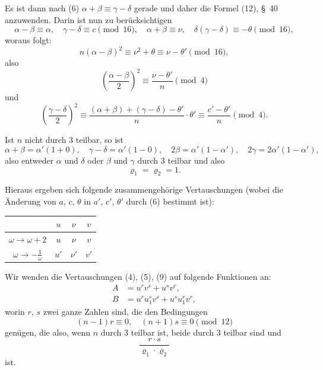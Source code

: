 \documentclass[12pt,a4paper]{article}
\theoremstyle{definition}
\begin{document}
Es ist dann nach (6) $\alpha + \beta \equiv \gamma - \delta$ gerade und daher die Formel (12), \S\ 40 anzuwenden. Darin ist nun zu berücksichtigen
\[
\alpha - \beta \equiv \alpha, \quad \gamma - \delta \equiv c \pmod{16}, \quad \alpha + \beta \equiv \nu, \quad \delta(\gamma - \delta) \equiv -\theta \pmod{16},
\]
woraus folgt:
\[
n(\alpha - \beta)^2 \equiv \nu^2 + \theta \equiv \nu - \theta' \pmod{16},
\]
also
\[
\left(\frac{\alpha - \beta}{2}\right)^2 \equiv \frac{\nu - \theta'}{n} \pmod{4}
\]
und
\[
\left(\frac{\gamma - \delta}{2}\right)^2 \equiv \frac{(\alpha + \beta) + (\gamma - \delta) - \theta'}{n} \cdot \theta' \equiv \frac{c' - \theta'}{n} \pmod{4}.
\]

Ist $n$ nicht durch 3 teilbar, so ist
\[
\alpha + \beta = \alpha'(1 + 0), \quad \gamma - \delta = \alpha'(1 - 0), \quad 2\beta = \alpha'(1 - \alpha'), \quad 2\gamma = 2\alpha'(1 - \alpha'),
\]
also entweder $\alpha$ und $\delta$ oder $\beta$ und $\gamma$ durch 3 teilbar und also
\[
\varrho_1 = \varrho_2 = 1.
\]

Hieraus ergeben sich folgende zusammengehörige Vertauschungen (wobei die Änderung von $a$, $c$, $\theta$ in $a'$, $c'$, $\theta'$ durch (6) bestimmt ist):

\begin{center}
\begin{tabular}{c|ccc}
& $u$ & $\nu$ & $v$ \\
\midrule
$\omega \to \omega + 2$ & $u$ & $\nu$ & $v$ \\
$\omega \to -\frac{1}{\omega}$ & $u'$ & $\nu'$ & $v'$ \\
\end{tabular}
\end{center}

Wir wenden die Vertauschungen (4), (5), (9) auf folgende Funktionen an:
\begin{equation}\label{eq:73-10}
\begin{aligned}
A &= u^r v^s + u^s v^r, \\
B &= u^r u_1^s v^s + u^s u_1^r v^r,
\end{aligned}
\end{equation}
worin $r$, $s$ zwei ganze Zahlen sind, die den Bedingungen
\begin{equation}\label{eq:73-11}
(n-1)r \equiv 0, \quad (n+1)s \equiv 0 \pmod{12}
\end{equation}
genügen, die also, wenn $n$ durch 3 teilbar ist, beide durch 3 teilbar sind und
\[
\frac{r \cdot s}{\varrho_1 \cdot \varrho_2}
\]
ist.
\end{document}
